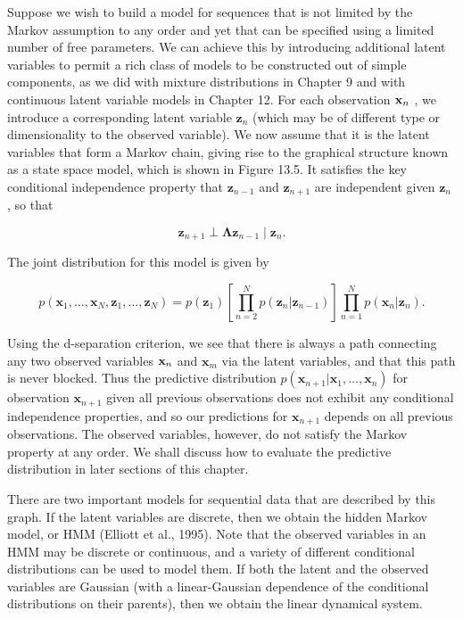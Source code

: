 \documentclass[
  10
]{article}
\begin{document}
Suppose we wish to build a model for sequences that is not limited by
the Markov assumption to any order and yet that can be specified using a
limited number of free parameters. We can achieve this by introducing
additional latent variables to permit a rich class of models to be
constructed out of simple components, as we did with mixture
distributions in Chapter 9 and with continuous latent variable models in
Chapter 12. For each observation \({ \bf x } _ { n }\) , we introduce a
corresponding latent variable \(\mathbf { z } _ { n }\) (which may be of
different type or dimensionality to the observed variable). We now
assume that it is the latent variables that form a Markov chain, giving
rise to the graphical structure known as a state space model, which is
shown in Figure 13.5. It satisfies the key conditional independence
property that \(\mathbf { z } _ { n - 1 }\) and
\(\mathbf { z } _ { n + 1 }\) are independent given
\(\mathbf { z } _ { n }\) , so that

\[
\mathbf {z} _ {n + 1} \perp \mathbf {\Lambda} \mathbf {z} _ {n - 1} \mid \mathbf {z} _ {n}.\tag{13.5}
\]

The joint distribution for this model is given by

\[
p (\mathbf {x} _ {1}, \dots , \mathbf {x} _ {N}, \mathbf {z} _ {1}, \dots , \mathbf {z} _ {N}) = p (\mathbf {z} _ {1}) \left[ \prod_ {n = 2} ^ {N} p (\mathbf {z} _ {n} | \mathbf {z} _ {n - 1}) \right] \prod_ {n = 1} ^ {N} p (\mathbf {x} _ {n} | \mathbf {z} _ {n}).\tag{13.6}
\]

Using the d-separation criterion, we see that there is always a path
connecting any two observed variables \({ \bf x } _ { n }\) and
\(\mathbf { x } _ { m }\) via the latent variables, and that this path
is never blocked. Thus the predictive distribution
\(p ( \mathbf { x } _ { n + 1 } | \mathbf { x } _ { 1 } , \ldots , \mathbf { x } _ { n } )\)
for observation \(\mathbf { x } _ { n + 1 }\) given all previous
observations does not exhibit any conditional independence properties,
and so our predictions for \(\mathbf { x } _ { n + 1 }\) depends on all
previous observations. The observed variables, however, do not satisfy
the Markov property at any order. We shall discuss how to evaluate the
predictive distribution in later sections of this chapter.

There are two important models for sequential data that are described by
this graph. If the latent variables are discrete, then we obtain the
hidden Markov model, or HMM (Elliott et al., 1995). Note that the
observed variables in an HMM may be discrete or continuous, and a
variety of different conditional distributions can be used to model
them. If both the latent and the observed variables are Gaussian (with a
linear-Gaussian dependence of the conditional distributions on their
parents), then we obtain the linear dynamical system.
\end{document}
